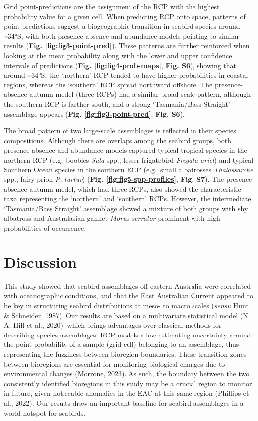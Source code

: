 \documentclass{article}
\begin{document}
Grid point-predictions are the assignment of the RCP with the highest probability value for a given cell. When predicting RCP onto space, patterns of point-predictions suggest a biogeographic transition in seabird species around \textasciitilde34°S, with both presence-absence and abundance models pointing to similar results (\textbf{Fig. \ref{fig:fig3-point-pred}}). These patterns are further reinforced when looking at the mean probability along with the lower and upper confidence intervals of predictions (\textbf{Fig. \ref{fig:fig4-prob-maps}}, \textbf{Fig. S6}), showing that around \textasciitilde34°S, the `northern' RCP tended to have higher probabilities in coastal regions, whereas the `southern' RCP spread northward offshore. The presence-absence-autumn model (three RCPs) had a similar broad-scale pattern, although the southern RCP is farther south, and a strong `Tasmania/Bass Straight' assemblage appears (\textbf{Fig. \ref{fig:fig3-point-pred}}, \textbf{Fig. S6}).

The broad pattern of two large-scale assemblages is reflected in their species compositions. Although there are overlaps among the seabird groups, both presence-absence and abundance models captured typical tropical species in the northern RCP (e.g.~boobies \emph{Sula} spp., lesser frigatebird \emph{Fregata ariel}) and typical Southern Ocean species in the southern RCP (e.g.~small albatrosses \emph{Thalassarche} spp., fairy prion \emph{P. turtur}) (\textbf{Fig. \ref{fig:fig5-spp-profiles}}, \textbf{Fig. S7}). The presence-absence-autumn model, which had three RCPs, also showed the characteristic taxa representing the `northern' and `southern' RCPs. However, the intermediate `Tasmania/Bass Straight' assemblage showed a mixture of both groups with shy albatross and Australasian gannet \emph{Morus serrator} prominent with high probabilities of occurrence.

\hypertarget{discussion}{%
\section{Discussion}\label{discussion}}

This study showed that seabird assemblages off eastern Australia were correlated with oceanographic conditions, and that the East Australian Current appeared to be key in structuring seabird distributions at meso- to macro scales (\emph{sensu} Hunt \& Schneider, 1987). Our results are based on a multivariate statistical model (N. A. Hill et al., 2020), which brings advantages over classical methods for describing species assemblages. RCP models allow estimating uncertainty around the point probability of a sample (grid cell) belonging to an assemblage, thus representing the fuzziness between bioregion boundaries. These transition zones between bioregions are essential for monitoring biological changes due to environmental changes (Morrone, 2023). As such, the boundary between the two consistently identified bioregions in this study may be a crucial region to monitor in future, given noticeable anomalies in the EAC at this same region (Phillips et al., 2022). Our results draw an important baseline for seabird assemblages in a world hotspot for seabirds.
\end{document}
